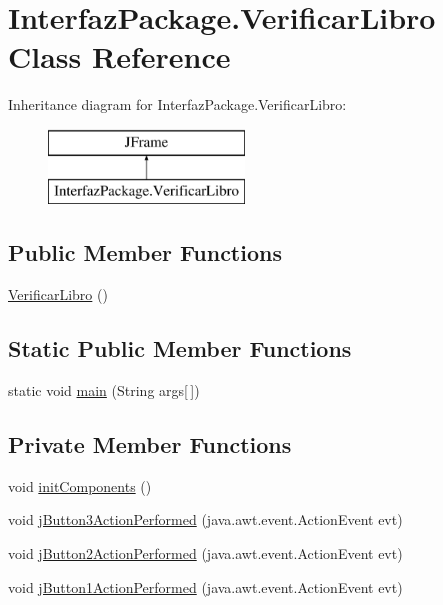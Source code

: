 \hypertarget{class_interfaz_package_1_1_verificar_libro}{}\section{Interfaz\+Package.\+Verificar\+Libro Class Reference}
\label{class_interfaz_package_1_1_verificar_libro}
Inheritance diagram for Interfaz\+Package.\+Verificar\+Libro\+:\begin{figure}[H]
\begin{center}
\leavevmode
\includegraphics[height=2.000000cm]{class_interfaz_package_1_1_verificar_libro}
\end{center}
\end{figure}
\subsection*{Public Member Functions}
\begin{DoxyCompactItemize}
\item 
\mbox{\hyperlink{class_interfaz_package_1_1_verificar_libro_ac01e8d1171535f57f24d6eed709a3d2b}{Verificar\+Libro}} ()
\end{DoxyCompactItemize}
\subsection*{Static Public Member Functions}
\begin{DoxyCompactItemize}
\item 
static void \mbox{\hyperlink{class_interfaz_package_1_1_verificar_libro_ab9ea8b3c763d9d3f43efefa6a3390761}{main}} (String args\mbox{[}$\,$\mbox{]})
\end{DoxyCompactItemize}
\subsection*{Private Member Functions}
\begin{DoxyCompactItemize}
\item 
void \mbox{\hyperlink{class_interfaz_package_1_1_verificar_libro_a37b15a7249b7b66e739622d43a9198b9}{init\+Components}} ()
\item 
void \mbox{\hyperlink{class_interfaz_package_1_1_verificar_libro_ab0bc4b49fa212e8da0ca24828257116d}{j\+Button3\+Action\+Performed}} (java.\+awt.\+event.\+Action\+Event evt)
\item 
void \mbox{\hyperlink{class_interfaz_package_1_1_verificar_libro_a15b0fbfa1b64f9124a429e4ea8075241}{j\+Button2\+Action\+Performed}} (java.\+awt.\+event.\+Action\+Event evt)
\item 
void \mbox{\hyperlink{class_interfaz_package_1_1_verificar_libro_a1e2ce8da1553133da46ea787b2e793c1}{j\+Button1\+Action\+Performed}} (java.\+awt.\+event.\+Action\+Event evt)
\end{DoxyCompactItemize}
